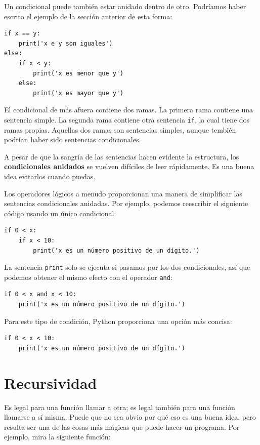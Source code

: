 \documentclass[10pt]{book}
\begin{document}
Un condicional puede también estar anidado dentro de otro.  Podríamos haber
escrito el ejemplo de la sección anterior de esta forma:

\begin{verbatim}
if x == y:
    print('x e y son iguales')
else:
    if x < y:
        print('x es menor que y')
    else:
        print('x es mayor que y')
\end{verbatim}
%
El condicional de más afuera contiene dos ramas.  La
primera rama contiene una sentencia simple.  La segunda rama
contiene otra sentencia {\tt if}, la cual tiene dos ramas
propias.  Aquellas dos ramas son sentencias simples,
aunque tembién podrían haber sido sentencias condicionales.

A pesar de que la sangría de las sentencias hacen evidente la
estructura, los {\bf condicionales anidados} se vuelven difíciles de leer
rápidamente.  Es una buena idea evitarlos cuando puedas.

Los operadores lógicos a menudo proporcionan una manera de simplificar las sentencias condicionales
anidadas.  Por ejemplo, podemos reescribir el siguiente código usando un
único condicional:

\begin{verbatim}
if 0 < x:
    if x < 10:
        print('x es un número positivo de un dígito.')
\end{verbatim}
%
La sentencia {\tt print} solo se ejecuta si pasamos por los dos
condicionales, así que podemos obtener el mismo efecto con el operador {\tt and}:

\begin{verbatim}
if 0 < x and x < 10:
    print('x es un número positivo de un dígito.')
\end{verbatim}

Para este tipo de condición, Python proporciona una opción más concisa:

\begin{verbatim}
if 0 < x < 10:
    print('x es un número positivo de un dígito.')
\end{verbatim}


\section{Recursividad}
\label{recursion}

Es legal para una función llamar a otra;
es legal también para una función llamarse a sí misma.  Puede que no sea obvio
por qué eso es una buena idea, pero resulta ser una de las cosas más
mágicas que puede hacer un programa.
Por ejemplo, mira la siguiente función:
\end{document}
